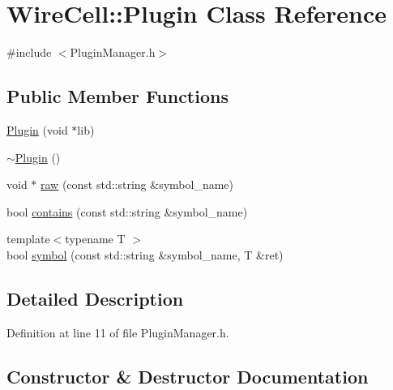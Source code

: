 \hypertarget{class_wire_cell_1_1_plugin}{}\section{Wire\+Cell\+:\+:Plugin Class Reference}
\label{class_wire_cell_1_1_plugin}


{\ttfamily \#include $<$Plugin\+Manager.\+h$>$}

\subsection*{Public Member Functions}
\begin{DoxyCompactItemize}
\item 
\hyperlink{class_wire_cell_1_1_plugin_ac49914ee387d36891a68c4f2308d8f6d}{Plugin} (void $\ast$lib)
\item 
\hyperlink{class_wire_cell_1_1_plugin_aee4cc1864a2afa84a9ad935153f3fe39}{$\sim$\+Plugin} ()
\item 
void $\ast$ \hyperlink{class_wire_cell_1_1_plugin_a6532d3eb05241c25780a18194cd6572f}{raw} (const std\+::string \&symbol\+\_\+name)
\item 
bool \hyperlink{class_wire_cell_1_1_plugin_ab8f49d4beba0924fa53ba45ec54ad649}{contains} (const std\+::string \&symbol\+\_\+name)
\item 
{\footnotesize template$<$typename T $>$ }\\bool \hyperlink{class_wire_cell_1_1_plugin_ac2e03f3242aed84a08647cd2d2e5f960}{symbol} (const std\+::string \&symbol\+\_\+name, T \&ret)
\end{DoxyCompactItemize}


\subsection{Detailed Description}


Definition at line 11 of file Plugin\+Manager.\+h.



\subsection{Constructor \& Destructor Documentation}
\mbox{\label{class_wire_cell_1_1_plugin_ac49914ee387d36891a68c4f2308d8f6d}} 
